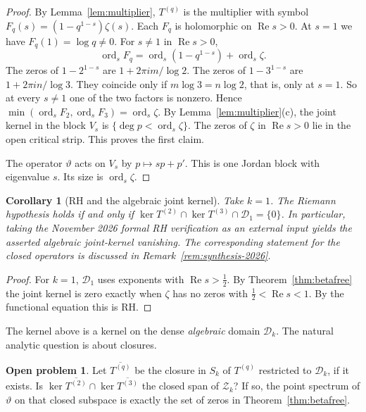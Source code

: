 \documentclass[12pt,letterpaper]{article}
\newtheorem{corollary}[theorem]{Corollary}
\theoremstyle{definition}
\newtheorem{problem}[theorem]{Open problem}
\theoremstyle{remark}
\numberwithin{equation}{section}
\newcommand{\Ree}{\operatorname{Re}}
\newcommand{\Dk}{\mathcal{D}_k}
\newcommand{\kerop}{\operatorname{ker}}
\newcommand{\ord}{\operatorname{ord}}
\newcommand{\yD}{\vartheta}
\begin{document}
\begin{proof}
By Lemma~\ref{lem:multiplier}, $T^{(q)}$ is the multiplier with symbol
$F_q(s)=(1-q^{1-s})\zeta(s)$. Each $F_q$ is holomorphic on $\Ree s>0$. At
$s=1$ we have $F_q(1)=\log q\ne0$. For $s\ne1$ in $\Ree s>0$,
\[
\ord_sF_q=\ord_s(1-q^{1-s})+\ord_s\zeta.
\]
The zeros of $1-2^{1-s}$ are $1+2\pi im/\log2$. The zeros of $1-3^{1-s}$
are $1+2\pi in/\log3$. They coincide only if $m\log3=n\log2$, that is,
only at $s=1$. So at every $s\ne1$ one of the two factors is nonzero. Hence
$\min(\ord_sF_2,\ord_sF_3)=\ord_s\zeta$. By Lemma~\ref{lem:multiplier}(c),
the joint kernel in the block $V_s$ is $\{\deg p<\ord_s\zeta\}$. The zeros
of $\zeta$ in $\Ree s>0$ lie in the open critical strip. This proves the
first claim.

The operator $\yD$ acts on $V_s$ by $p\mapsto sp+p'$. This is one Jordan
block with eigenvalue $s$. Its size is $\ord_s\zeta$.
\end{proof}

\begin{corollary}[RH and the algebraic joint kernel]
Take $k=1$. The Riemann hypothesis holds if and only if
$\kerop T^{(2)}\cap\kerop T^{(3)}\cap\mathcal D_1=\{0\}$.
In particular, taking the November 2026 formal RH verification
\cite{LF26,Ru26} as an external input yields the asserted
\emph{algebraic} joint-kernel vanishing.  The corresponding statement
for the closed operators is discussed in
Remark~\ref{rem:synthesis-2026}.
\end{corollary}

\begin{proof}
For $k=1$, $\mathcal D_1$ uses exponents with $\Ree s>\frac12$. By
Theorem~\ref{thm:betafree} the joint kernel is zero exactly when $\zeta$ has
no zeros with $\frac12<\Ree s<1$. By the functional equation this is RH.
\end{proof}

The kernel above is a kernel on the dense \emph{algebraic} domain $\Dk$.
The natural analytic question is about closures.

\begin{problem}\label{prob:synthesis}
Let $\overline{T^{(q)}}$ be the closure in $S_k$ of $T^{(q)}$ restricted to
$\Dk$, if it exists. Is $\kerop\overline{T^{(2)}}\cap\kerop\overline{T^{(3)}}$
the closed span of $\mathcal Z_k$? If so, the point spectrum of $\yD$ on
that closed subspace is exactly the set of zeros in
Theorem~\ref{thm:betafree}.
\end{problem}
\end{document}
